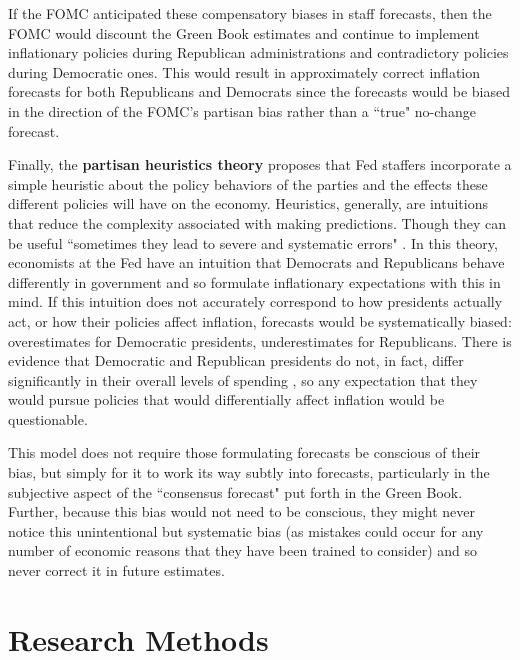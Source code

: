 \documentclass[a4paper]{article}\usepackage{graphicx, color}
\begin{document}
If the FOMC anticipated these compensatory biases in staff forecasts, then the FOMC would discount the Green Book estimates and continue to implement inflationary policies during Republican administrations and contradictory policies during Democratic ones. This would result in approximately correct inflation forecasts for both Republicans and Democrats since the forecasts would be biased in the direction of the FOMC's partisan bias rather than a ``true" no-change forecast.
 
Finally, the {\bf{partisan heuristics theory}} proposes that Fed staffers incorporate a simple heuristic \citep[see][]{kahneman1973, tverskykahneman1974, kahneman2003} about the policy behaviors of the parties and the effects these different policies will have on the economy. Heuristics, generally, are intuitions that reduce the complexity associated with making predictions. Though they can be useful ``sometimes they lead to severe and systematic errors" \citep[][1124]{tverskykahneman1974}. In this theory, economists at the Fed have an intuition that Democrats and Republicans behave differently in government and so formulate inflationary expectations with this in mind. If this intuition does not accurately correspond to how presidents actually act, or how their policies affect inflation, forecasts would be systematically biased: overestimates for Democratic presidents, underestimates for Republicans. There is evidence that Democratic and Republican presidents do not, in fact, differ significantly in their overall levels of spending \citep{Bartels2008}, so any expectation that they would pursue policies that would differentially affect inflation would be questionable.

This model does not require those formulating forecasts be conscious of their bias, but simply for it to work its way subtly into forecasts, particularly in the subjective aspect of the ``consensus forecast" put forth in the Green Book. Further, because this bias would not need to be conscious, they might never notice this unintentional but systematic bias (as mistakes could occur for any number of economic reasons that they have been trained to consider) and so never correct it in future estimates.



\section{Research Methods}
\end{document}
